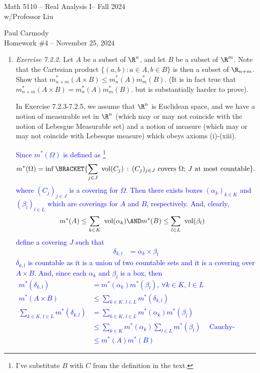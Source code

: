 \documentclass[10pt,a4paper]{report}
\newcommand{\CLASSNAME}{Math 5110 -- Real Analysis I}
\newcommand{\STUDENTNAME}{Paul Carmody}
\newcommand{\ASSIGNMENT}{Homework \#4 }
\newcommand{\DUEDATE}{November 25, 2024}
\newcommand{\SEMESTER}{Fall 2024}
\newcommand{\BLUE}[1]{\textcolor{blue}{#1}}
\begin{document}
\begin{center}
	\Large{\CLASSNAME -- \SEMESTER} \\
	\large{ w/Professor Liu}
\end{center}
\begin{center}
	\STUDENTNAME \\
	\ASSIGNMENT -- \DUEDATE\\
\end{center} 

\newcommand{\VOL}{\text{ vol}}
\begin{enumerate}[label=\Roman*.]
\item \textit{Exercise 7.2.2.}  Let $A$ be a subset of $\R^n$, and let $B$ be a subset of $\R^m$.  Note that the Cartesian product $\{(a,b): a\in A, b\in B\}$ is then a subset of $\R_{n+m}$.  Show that $m_{n+m}^*(A\times B) \le m_n^*(A)m_m^*(B)$.  (It is in fact true that $m_{n+m}^*(A\times B) = m_n^*(A)m_m^*(B)$. but is substantially harder to prove).

In Exercise 7.2.3-7.2.5, we assume that $\R^n$ is Euclidean space, and we have a notion of measurable set in $\R^n$ (which may or may not coincide with the notion of Lebesgue Measurable set)  and a notion of measure (which may or may not coincide with Lebesque measure) which obeys axioms (i)-(xiii).

\BLUE{Since $m^*(\Omega)$ is defined as \footnote{I've substitute $B$ with $C$ from the definition in the text.}
\begin{align*}
	m^*(\Omega) &= \inf\BRACKET{\sum_{j\in J}\VOL (C_j)\,:\, (C_j)_{j\in J}\text{ covers }\Omega;\, J\text{ at most countable}}.
\end{align*}where $(C_j)_{j\in J}$ is a covering for $\Omega$.  Then there exists boxes $(\alpha_k)_{k \in K}$ and $(\beta_l)_{l\in L}$ which are coverings for $A$ and $B$, respectively. And, clearly,
\begin{align*}
	m^*(A) &\le \sum_{k\in K} \VOL(\alpha_k) \AND m^*(B) \le \sum_{l\in L} \VOL(\beta_l)
\end{align*}define a covering $J$ such that
\begin{align*}
	\delta_{k,l} &= \alpha_k \times \beta_l
\end{align*}$\delta_{k,l}$ is countable as it is a union of two countable sets and it is a covering over $A\times B$.  And, since each $\alpha_k$ and $\beta_l$ is a box, then 
\begin{align*}
	m^*(\delta_{k,l}) &= m^*(\alpha_k)m^*(\beta_l),\,\forall k\in K, \, l \in L \\
	m^*(A \times B) &\le \sum_{k\in K,\, l\in L} m^*(\delta_{k,l}) \\
	\sum_{k\in K,\, l\in L} m^*(\delta_{k,l}) &= \sum_{k\in K,\, l\in L} m^*(\alpha_k)m^*(\beta_l) \\
	&\le \sum_{k\in K} m^*(\alpha_k) \sum_{l \in L} m^*(\beta_l) & \text{Cauchy-Schwarz} \\
	&\le m^*(A)m^*(B)
\end{align*}
}


\end{enumerate}
\end{document}
